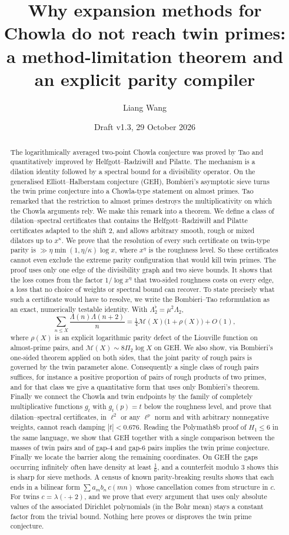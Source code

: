 \documentclass[11pt]{amsart}
\title[Dilation methods and the twin prime parity barrier]{Why expansion methods for Chowla do not reach twin primes:\\ a method-limitation theorem and an explicit parity compiler}
\author{Liang Wang}
\date{Draft v1.3, 29 October 2026}
\theoremstyle{definition}
\theoremstyle{remark}
\newcommand{\Lflat}{\Lambda_2^{\flat}}
\begin{document}
\begin{abstract}
The logarithmically averaged two-point Chowla conjecture was proved by Tao and quantitatively improved by Helfgott--Radziwi\l{}\l{} and Pilatte. The mechanism is a dilation identity followed by a spectral bound for a divisibility operator. On the generalised Elliott--Halberstam conjecture (GEH), Bombieri's asymptotic sieve turns the twin prime conjecture into a Chowla-type statement on almost primes. Tao remarked that the restriction to almost primes destroys the multiplicativity on which the Chowla arguments rely. We make this remark into a theorem. We define a class of dilation--spectral certificates that contains the Helfgott--Radziwi\l{}\l{} and Pilatte certificates adapted to the shift $2$, and allows arbitrary smooth, rough or mixed dilators up to $x^{\kappa}$. We prove that the resolution of every such certificate on twin-type parity is $\gg\eta\min(1,\eta/\kappa)\log x$, where $x^\eta$ is the roughness level. So these certificates cannot even exclude the extreme parity configuration that would kill twin primes. The proof uses only one edge of the divisibility graph and two sieve bounds. It shows that the loss comes from the factor $1/\log x^\eta$ that two-sided roughness costs on every edge, a loss that no choice of weights or spectral bound can recover. To state precisely what such a certificate would have to resolve, we write the Bombieri--Tao reformulation as an exact, numerically testable identity. With $\Lflat=\mu^2\Lambda_2$,
\[
\sum_{n\le X}\frac{\Lambda(n)\Lambda(n+2)}{n}=\tfrac14\mathcal M(X)\bigl(1+\rho(X)\bigr)+O(1),
\]
where $\rho(X)$ is an explicit logarithmic parity defect of the Liouville function on almost-prime pairs, and $\mathcal M(X)\sim8\Pi_2\log X$ on GEH. We also show, via Bombieri's one-sided theorem applied on both sides, that the joint parity of rough pairs is governed by the twin parameter alone. Consequently a single class of rough pairs suffices, for instance a positive proportion of pairs of rough products of two primes, and for that class we give a quantitative form that uses only Bombieri's theorem. Finally we connect the Chowla and twin endpoints by the family of completely multiplicative functions $g_t$ with $g_t(p)=t$ below the roughness level, and prove that dilation--spectral certificates, in $\ell^2$ or any $\ell^p$ norm and with arbitrary nonnegative weights, cannot reach damping $|t|<0.676$. Reading the Polymath8b proof of $H_1\le6$ in the same language, we show that GEH together with a single comparison between the masses of twin pairs and of gap-$4$ and gap-$6$ pairs implies the twin prime conjecture. Finally we locate the barrier along the remaining coordinates. On GEH the gaps occurring infinitely often have density at least $\frac16$, and a counterfeit modulo $3$ shows this is sharp for sieve methods. A census of known parity-breaking results shows that each ends in a bilinear form $\sum a_mb_n\,c(mn)$ whose cancellation comes from structure in $c$. For twins $c=\lambda(\cdot+2)$, and we prove that every argument that uses only absolute values of the associated Dirichlet polynomials (in the Bohr mean) stays a constant factor from the trivial bound. Nothing here proves or disproves the twin prime conjecture.
\end{abstract}
\end{document}
